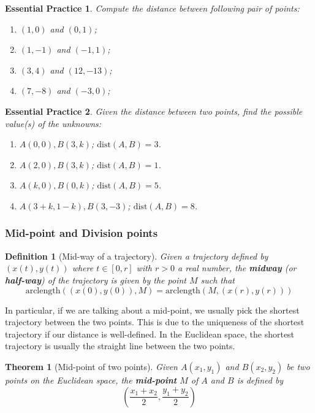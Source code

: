 \documentclass[12pt]{article}
\newtheorem{definition}{Definition}[section]
\newtheorem*{theorem}{Theorem}
\newtheorem{exercise}{Essential Practice}[subsubsection]
\begin{document}
    \begin{exercise}
        Compute the distance between following pair of points:\begin{enumerate}
            \item $(1,0)$ and $(0,1)$;
            \item $(1,-1)$ and $(-1,1)$;
            \item $(3,4)$ and $(12,-13)$;
            \item $(7,-8)$ and $(-3,0)$;
        \end{enumerate}
    \end{exercise}

    \begin{exercise}
        Given the distance between two points, find the possible value(s) of the unknowns:\begin{enumerate}
            \item $A(0,0), B(3,k)$; $\mathrm{dist}(A,B)=3$.
            \item $A(2,0), B(3,k)$; $\mathrm{dist}(A,B)=1$.
            \item $A(k,0), B(0,k)$; $\mathrm{dist}(A,B)=5$.
            \item $A(3+k,1-k), B(3,-3)$; $\mathrm{dist}(A,B)=8$.
        \end{enumerate}
    \end{exercise}

    \subsubsection{Mid-point and Division points}

    \begin{definition}[Mid-way of a trajectory]
        Given a trajectory defined by $(x(t),y(t))$ where $t\in [0,r]$ with $r>0$ a real number, the \textbf{midway} (or \textbf{half-way}) of the trajectory is given by the point $M$ such that $$\mathrm{arclength}((x(0),y(0)),M)=\mathrm{arclength}(M,(x(r),y(r)))$$
    \end{definition}

    In particular, if we are talking about a mid-point, we usually pick the shortest trajectory between the two points. This is due to the uniqueness of the shortest trajectory if our distance is well-defined. In the Euclidean space, the shortest trajectory is usually the straight line between the two points.

    \begin{theorem}[Mid-point of two points]
        Given $A(x_1,y_1)$ and $B(x_2,y_2)$ be two points on the Euclidean space, the \textbf{mid-point} $M$ of $A$ and $B$ is defined by $$(\frac{x_1+x_2}{2},\frac{y_1+y_2}{2})$$
    \end{theorem}
\end{document}
